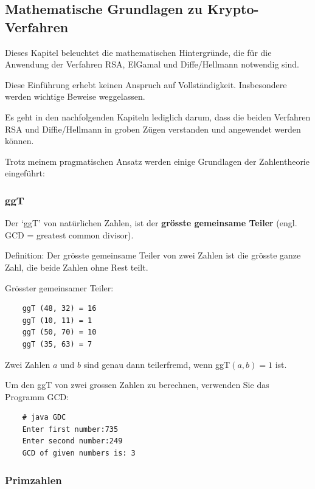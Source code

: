 \subsection{Mathematische Grundlagen zu Krypto-Verfahren}

Dieses Kapitel beleuchtet die mathematischen Hintergründe, die für
die Anwendung der Verfahren RSA, ElGamal und Diffe/Hellmann notwendig sind.

Diese Einführung erhebt keinen Anspruch auf Vollständigkeit.
Insbesondere werden wichtige Beweise weggelassen.

Es geht in den nachfolgenden Kapiteln lediglich darum, dass die
beiden Verfahren RSA und Diffie/Hellmann in groben Zügen verstanden
und angewendet werden können.

Trotz meinem pragmatischen Ansatz werden einige Grundlagen der
Zahlentheorie eingeführt:

\subsubsection*{ggT}

Der `ggT' von natürlichen Zahlen, ist der \textbf{grösste gemeinsame
Teiler} (engl. GCD = greatest common divisor).

Definition: Der grösste gemeinsame Teiler von zwei Zahlen ist die
grösste ganze Zahl, die beide Zahlen ohne Rest teilt.

\begin{beispiel}[ggT]
    \label{ex:ggt}
    Grösster gemeinsamer Teiler:
\end{beispiel}

\begin{verbatim}
    ggT (48, 32) = 16
    ggT (10, 11) = 1
    ggT (50, 70) = 10
    ggT (35, 63) = 7
\end{verbatim}

\begin{bemerkung}
    Zwei Zahlen $a$ und $b$ sind genau dann teilerfremd, wenn ggT$(a, b) = 1$ ist.
\end{bemerkung}

Um den ggT von zwei grossen Zahlen zu berechnen, verwenden Sie das Programm GCD:

\begin{verbatim}
    # java GDC
    Enter first number:735
    Enter second number:249
    GCD of given numbers is: 3
\end{verbatim}

\subsubsection*{Primzahlen}

